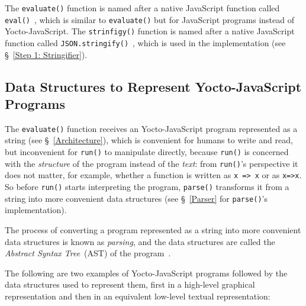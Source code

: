 \documentclass[12pt, oneside]{book}
\begin{document}
\begin{mdframed}[frametitle = {Advanced}]
The \texttt{evaluate()} function is named after a native JavaScript function called \texttt{eval()}~\cite{javascript-eval}, which is similar to \texttt{evaluate()} but for JavaScript programs instead of Yocto-JavaScript. The \texttt{strinfigy()} function is named after a native JavaScript function called \texttt{JSON.stringify()}~\cite{javascript-json-stringify}, which is used in the implementation (see §~\ref{Step 1: Stringifier}).
\end{mdframed}

\subsection{Data Structures to Represent Yocto-JavaScript Programs}
\label{Data Structures to Represent Yocto-JavaScript Programs}

The \texttt{evaluate()} function receives an Yocto-JavaScript program represented as a string (see §~\ref{Architecture}), which is convenient for humans to write and read, but inconvenient for \texttt{run()} to manipulate directly, because \texttt{run()} is concerned with the \emph{structure} of the program instead of the \emph{text}: from \texttt{run()}’s perspective it does not matter, for example, whether a function is written as \texttt{x => x} or as \texttt{x=>x}. So before \texttt{run()} starts interpreting the program, \texttt{parse()} transforms it from a string into more convenient data structures (see §~\ref{Parser} for \texttt{parse()}’s implementation).

\begin{mdframed}[frametitle = {Technical Terms}]
The process of converting a program represented as a string into more convenient data structures is known as \emph{parsing}, and the data structures are called the \emph{Abstract Syntax Tree}~(AST) of the program~\cite[§~4]{dragon-book}.
\end{mdframed}

The following are two examples of Yocto-JavaScript programs followed by the data structures used to represent them, first in a high-level graphical representation and then in an equivalent low-level textual representation:
\end{document}
